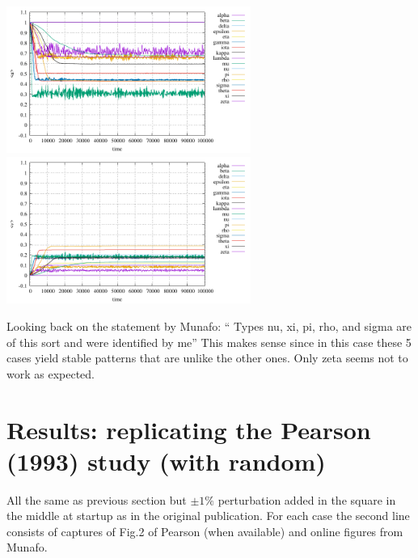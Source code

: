 \includegraphics[width=8cm]{python_codes/fieldstone_171/pearson93/stats_u.pdf}
\includegraphics[width=8cm]{python_codes/fieldstone_171/pearson93/stats_v.pdf}


Looking back on the statement by Munafo: ``
Types nu, xi, pi, rho, and sigma are of this sort and were identified by me''
This makes sense since in this case these 5 cases yield stable patterns 
that are unlike the other ones.
Only zeta seems not to work as expected.


\newpage
\section*{Results: replicating the Pearson (1993) study (with random)}

All the same as previous section but $\pm 1\%$ perturbation added in the square 
in the middle at startup as in the original publication.
For each case the second line consists of captures of Fig.2 of Pearson (when available) and online figures from Munafo.


